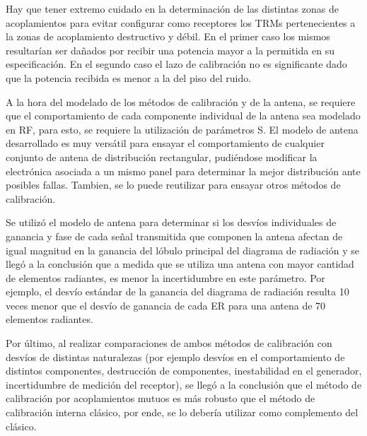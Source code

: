 Hay que tener extremo cuidado en la determinación de las distintas zonas de acoplamientos para evitar configurar como receptores
los TRMs pertenecientes a la zonas de acoplamiento destructivo y débil. En el primer caso los mismos resultarían ser dañados por
recibir una potencia mayor a la permitida en su especificación. En el segundo caso el lazo de calibración no es significante dado
que la potencia recibida es menor a la del piso del ruido. 

A la hora del modelado de los métodos de calibración y de la antena, se requiere que el comportamiento de cada componente 
individual de la antena sea modelado en RF, para esto, se requiere la utilización de parámetros S. El modelo de antena 
desarrollado es muy versátil para ensayar el comportamiento de cualquier conjunto de antena de distribución rectangular, 
pudiéndose modificar la electrónica asociada a un mismo panel para determinar la mejor distribución ante posibles fallas.
Tambien, se lo puede reutilizar para ensayar otros métodos de calibración.

Se utilizó el modelo de antena para determinar si los desvíos individuales de ganancia y fase de cada señal transmitida que 
componen la antena afectan de igual magnitud en la ganancia del lóbulo principal del diagrama de radiación y se llegó a la 
conclusión que a medida que se utiliza una antena con mayor cantidad de elementos radiantes, es menor la incertidumbre en este 
parámetro. Por ejemplo, el desvío estándar de la ganancia del diagrama de radiación resulta 10 veces menor que el desvío de 
ganancia de cada ER para una antena de 70 elementos radiantes.

Por último, al realizar comparaciones de ambos métodos de calibración con desvíos de distintas naturalezas (por ejemplo desvíos
en el comportamiento de distintos componentes, destrucción de componentes, inestabilidad en el generador, incertidumbre de medición 
del receptor), se llegó a la conclusión que el método de calibración por acoplamientos mutuos es más robusto que el método de
calibración interna clásico, por ende, se lo debería utilizar como complemento del clásico.

